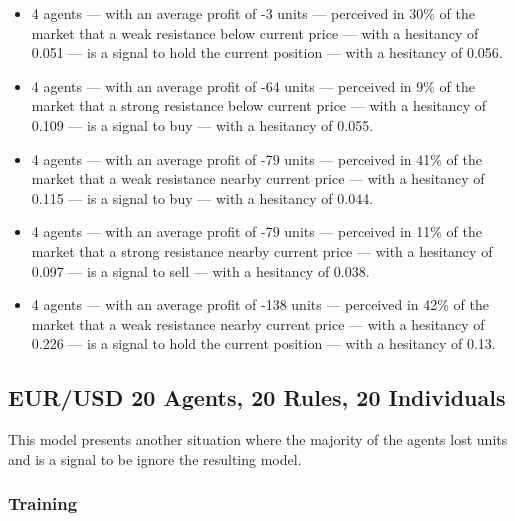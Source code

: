 {\small
  \begin{itemize}
  \item 4 agents — with an average profit of -3 units — perceived in 30\% of the
    market that a weak resistance below current price — with a hesitancy of
    0.051 — is a signal to hold the current position — with a hesitancy of
    0.056.
  \item 4 agents — with an average profit of -64 units — perceived in 9\% of the
    market that a strong resistance below current price — with a hesitancy of
    0.109 — is a signal to buy — with a hesitancy of 0.055.
  \item 4 agents — with an average profit of -79 units — perceived in 41\% of
    the market that a weak resistance nearby current price — with a hesitancy of
    0.115 — is a signal to buy — with a hesitancy of 0.044.
  \item 4 agents — with an average profit of -79 units — perceived in 11\% of
    the market that a strong resistance nearby current price — with a hesitancy
    of 0.097 — is a signal to sell — with a hesitancy of 0.038.
  \item 4 agents — with an average profit of -138 units — perceived in 42\% of
    the market that a weak resistance nearby current price — with a hesitancy of
    0.226 — is a signal to hold the current position — with a hesitancy of 0.13.
  \end{itemize}
}

\subsection{EUR/USD 20 Agents, 20 Rules, 20 Individuals}
\label{}

This model presents another situation where the majority of the agents lost units and is a signal to be ignore the resulting model.

\subsubsection{Training}
\label{}

